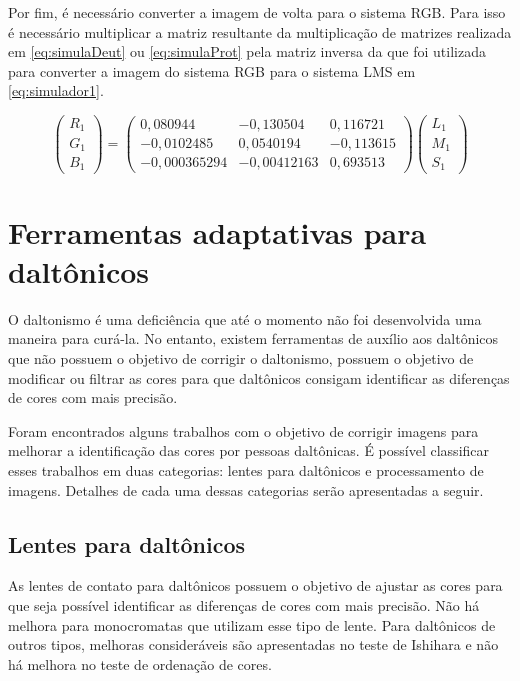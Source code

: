 \documentclass[	12pt, Times, openright, twoside, a4paper, english, brazil]{abntex2}
\begin{document}
Por fim, é necessário converter a imagem de volta para o sistema RGB. Para isso é necessário multiplicar a matriz resultante da multiplicação de matrizes realizada em \ref{eq:simulaDeut} ou \ref{eq:simulaProt} pela matriz inversa da que foi utilizada para converter a imagem do sistema RGB para o sistema LMS em \ref{eq:simulador1}.

\begin{equation}
\left(\begin{array}{ccc}
R_1\\G_1\\B_1
\end{array}\right)
=
\left(\begin{array}{ccc}
0,080944 & -0,130504 & 0,116721 \\
-0,0102485 & 0,0540194 & -0,113615 \\
-0,000365294 & -0,00412163 & 0,693513
\end{array}\right)
\left(\begin{array}{ccc}
L_1\\M_1\\S_1
\end{array}\right)
\label{eq:simulador2}
\end{equation}


\section{Ferramentas adaptativas para daltônicos}

O daltonismo é uma deficiência que até o momento não foi desenvolvida uma maneira para curá-la. No entanto, existem ferramentas de auxílio aos daltônicos que não possuem o objetivo de corrigir o daltonismo, possuem o objetivo de modificar ou filtrar as cores para que daltônicos consigam identificar as diferenças de cores com mais precisão. 
 
Foram encontrados alguns trabalhos com o objetivo de corrigir imagens para melhorar a identificação das cores por pessoas daltônicas. É possível classificar esses trabalhos em duas categorias: lentes para daltônicos e processamento de imagens. Detalhes de cada uma dessas categorias serão apresentadas a seguir.

\subsection{Lentes para daltônicos}

As lentes de contato para daltônicos possuem o objetivo de ajustar as cores para que seja possível identificar as diferenças de cores com mais precisão. Não há melhora para monocromatas que utilizam esse tipo de lente. Para daltônicos de outros tipos, melhoras consideráveis são apresentadas no teste de Ishihara e não há melhora no teste de ordenação de cores. 
\end{document}

